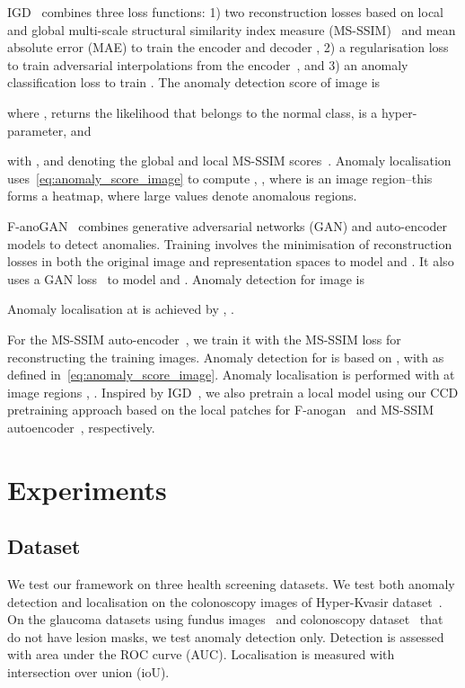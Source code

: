 \documentclass[runningheads]{llncs}
\begin{document}
IGD~\cite{chen2021unsupervised} combines three loss functions: 1) two reconstruction losses based on local and global multi-scale structural similarity index measure (MS-SSIM)~\cite{wang2003multiscale} and mean absolute error (MAE) to train the encoder  and decoder , 2) a regularisation loss to train adversarial interpolations from the encoder~\cite{berthelot2018understanding}, and 3) an anomaly  classification loss to train . The anomaly detection score of image  is

where ,
 returns the likelihood that  belongs to the normal class,  is a hyper-parameter, and

with ,  and  denoting the global and local MS-SSIM scores~\cite{chen2021unsupervised}.
Anomaly localisation uses~\eqref{eq:anomaly_score_image} to compute , , where  is an image region--this forms a heatmap, where large values denote anomalous regions.


F-anoGAN~\cite{F-anoGAN} combines generative adversarial networks (GAN) and auto-encoder models to detect anomalies. Training involves the minimisation of reconstruction losses in both the original image and representation spaces to model  and . It also uses a GAN loss~\cite{goodfellow2014generative} to model  and .  
Anomaly detection for image  is 

Anomaly localisation at  is achieved by , . 


 For the MS-SSIM auto-encoder~\cite{wang2003multiscale}, we train it with the MS-SSIM loss for reconstructing the training images. 
Anomaly detection for  is based on  , with  as defined in~\eqref{eq:anomaly_score_image}. Anomaly localisation is performed with  at image regions , . Inspired by IGD~\cite{chen2021unsupervised}, we also pretrain a local model using our CCD pretraining approach based on the local patches for F-anogan~\cite{F-anoGAN} and MS-SSIM autoencoder~\cite{wang2003multiscale}, respectively. 
 
 






\section{Experiments}



\subsection{Dataset}

We test our framework on three health screening datasets. We test both anomaly detection and localisation on the colonoscopy images of Hyper-Kvasir dataset~\cite{borgli2020hyperkvasir}.
On the glaucoma datasets using fundus images~\cite{li2019attention} and colonoscopy dataset~\cite{liu2019photoshopping} that do not have lesion masks, we test anomaly detection only.
Detection is assessed with area under the ROC curve (AUC). Localisation is measured with intersection over union (ioU).
\end{document}
